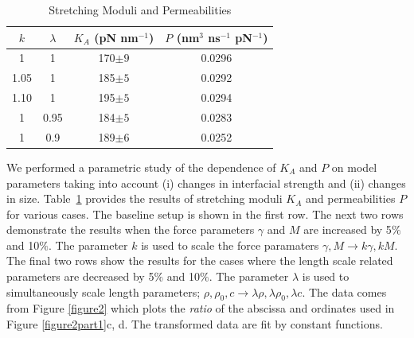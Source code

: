 \documentclass[lineno]{jfm}
\begin{document}
%

\begin{table}
\caption{Stretching Moduli and Permeabilities}
\centering
\begin{tabular}{ c |c| c |c }
 $k$ & $\lambda$ & $K_A$ (pN nm$^{-1}$) & $P$ (nm$^3$ ns$^{-1}$ pN$^{-1}$) \\
\hline    
 1  & 1  & 170$\pm9$   &  0.0296\\ 
%
 1.05 & 1  & 185$\pm5$  &  0.0292  \\ 
%
 1.10 & 1  & 195$\pm5$  &  0.0294 \\ 
%
 1 & 0.95  & 184$\pm5$  &  0.0283 \\ 
%
 1  & 0.9   & 189$\pm6$  &  0.0252  \\ 
\end{tabular} 
\label{table2}
\end{table}
%

We performed a parametric study of the dependence of $K_A$ and $P$
on model parameters taking into account   
(i) changes in interfacial strength and (ii) changes in size.
Table~\ref{table2} provides the results of stretching moduli $K_A$ and permeabilities $P$ for various cases.
The baseline setup is shown in the first row.
The next two rows demonstrate the results when the force parameters $\gamma$ and $M$ are increased by 5$\%$ and 10$\%$. 
The parameter $k$ is used to scale the force paramaters $\gamma, M \to k\gamma, kM$.
The final two rows show the results for the cases where the length scale related parameters are decreased by 5$\%$ and 10$\%$.
The parameter $\lambda$ is used to simultaneously scale length parameters;
$\rho, \rho_0, c \to \lambda \rho, \lambda \rho_0, \lambda c$.
The data comes from Figure \ref{figure2} which  plots the \emph{ratio} of the abscissa and ordinates
used in Figure \ref{figure2part1}c, d. The transformed data are fit by constant functions.  
\end{document}
